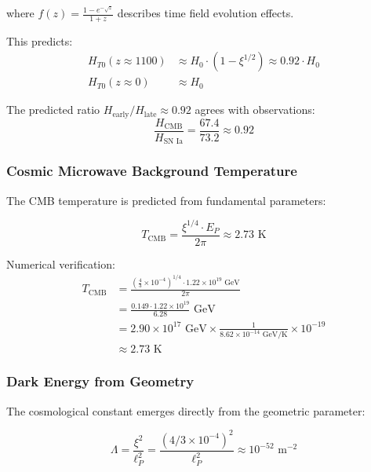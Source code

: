 \documentclass[12pt,a4paper]{article}
\theoremstyle{definition}
\begin{document}
where $f(z) = \frac{1 - e^{-\sqrt{z}}}{1 + z}$ describes time field evolution effects.

This predicts:
\begin{align}
	H_{T0}(z \approx 1100) &\approx H_0 \cdot (1 - \xi^{1/2}) \approx 0.92 \cdot H_0 \\
	H_{T0}(z \approx 0) &\approx H_0
\end{align}

The predicted ratio $H_{\text{early}}/H_{\text{late}} \approx 0.92$ agrees with observations:
\begin{equation}
	\frac{H_{\text{CMB}}}{H_{\text{SN Ia}}} = \frac{67.4}{73.2} \approx 0.92
\end{equation}

\subsubsection{Cosmic Microwave Background Temperature}

The CMB temperature is predicted from fundamental parameters:

\begin{equation}
	\boxed{T_{\text{CMB}} = \frac{\xi^{1/4} \cdot E_P}{2\pi} \approx 2.73 \text{ K}}
\end{equation}

\begin{verhaltnis}
	Numerical verification:
	\begin{align}
		T_{\text{CMB}} &= \frac{\left(\frac{4}{3} \times 10^{-4}\right)^{1/4} \cdot 1.22 \times 10^{19} \text{ GeV}}{2\pi}\\
		&= \frac{0.149 \cdot 1.22 \times 10^{19}}{6.28} \text{ GeV}\\
		&= 2.90 \times 10^{17} \text{ GeV} \times \frac{1}{8.62 \times 10^{-14} \text{ GeV/K}} \times 10^{-19}\\
		&\approx 2.73 \text{ K}
	\end{align}
\end{verhaltnis}

\subsubsection{Dark Energy from Geometry}

The cosmological constant emerges directly from the geometric parameter:

\begin{equation}
	\boxed{\Lambda = \frac{\xi^2}{\ell_P^2} = \frac{(4/3 \times 10^{-4})^2}{\ell_P^2} \approx 10^{-52} \text{ m}^{-2}}
\end{equation}
\end{document}
